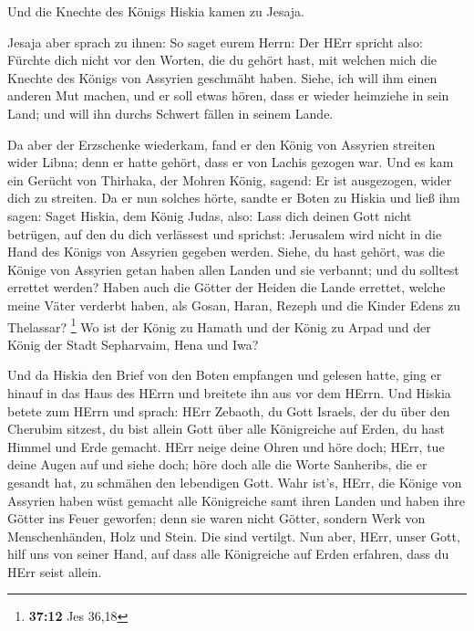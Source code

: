  Und die Knechte des Königs Hiskia kamen zu Jesaja.

 Jesaja aber sprach zu ihnen: So saget eurem Herrn: Der HErr
spricht also: Fürchte dich nicht vor den Worten, die du gehört hast, mit
welchen mich die Knechte des Königs von Assyrien geschmäht haben.
 Siehe, ich will ihm einen anderen Mut machen, und er soll
etwas hören, dass er wieder heimziehe in sein Land; und will ihn durchs
Schwert fällen in seinem Lande.

 Da aber der Erzschenke wiederkam, fand er den König von
Assyrien streiten wider Libna; denn er hatte gehört, dass er von Lachis
gezogen war.  Und es kam ein Gerücht von Thirhaka, der
Mohren König, sagend: Er ist ausgezogen, wider dich zu streiten.
 Da er nun solches hörte, sandte er Boten zu Hiskia und
ließ ihm sagen: Saget Hiskia, dem König Judas, also: Lass dich deinen
Gott nicht betrügen, auf den du dich verlässest und sprichst: Jerusalem
wird nicht in die Hand des Königs von Assyrien gegeben werden.
 Siehe, du hast gehört, was die Könige von Assyrien getan
haben allen Landen und sie verbannt; und du solltest errettet werden?
 Haben auch die Götter der Heiden die Lande errettet,
welche meine Väter verderbt haben, als Gosan, Haran, Rezeph und die
Kinder Edens zu Thelassar? \footnote{\textbf{37:12} Jes 36,18}
 Wo ist der König zu Hamath und der König zu Arpad und der
König der Stadt Sepharvaim, Hena und Iwa?

 Und da Hiskia den Brief von den Boten empfangen und
gelesen hatte, ging er hinauf in das Haus des HErrn und breitete ihn aus
vor dem HErrn.  Und Hiskia betete zum HErrn und sprach:
 HErr Zebaoth, du Gott Israels, der du über den Cherubim
sitzest, du bist allein Gott über alle Königreiche auf Erden, du hast
Himmel und Erde gemacht.  HErr neige deine Ohren und höre
doch; HErr, tue deine Augen auf und siehe doch; höre doch alle die Worte
Sanheribs, die er gesandt hat, zu schmähen den lebendigen Gott.
 Wahr ist's, HErr, die Könige von Assyrien haben wüst
gemacht alle Königreiche samt ihren Landen  und haben ihre
Götter ins Feuer geworfen; denn sie waren nicht Götter, sondern Werk von
Menschenhänden, Holz und Stein. Die sind vertilgt.  Nun
aber, HErr, unser Gott, hilf uns von seiner Hand, auf dass alle
Königreiche auf Erden erfahren, dass du HErr seist allein.

